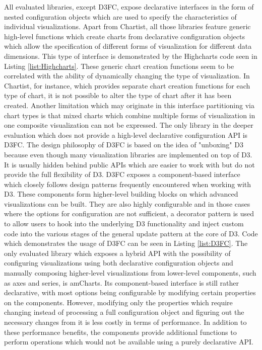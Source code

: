 All evaluated libraries, except D3FC, expose declarative interfaces in the form of nested configuration objects which are used to specify the characteristics of individual visualizations. 
Apart from Chartist, all those libraries feature generic high-level functions which create charts from declarative configuration objects which allow the specification of different forms of visualization for different data dimensions. 
This type of interface is demonstrated by the Highcharts code seen in Listing \ref{list:Highcharts}. 
These generic chart creation functions seem to be correlated with the ability of dynamically changing the type of visualization. 
In Chartist, for instance, which provides separate chart creation functions for each type of chart, it is not possible to alter the type of chart after it has been created. 
Another limitation which may originate in this interface partitioning via chart types is that mixed charts which combine multiple forms of visualization in one composite visualization can not be expressed. 
The only library in the deeper evaluation which does not provide a high-level declarative configuration API is D3FC. 
The design philosophy of D3FC is based on the idea of "unboxing" D3 because even though many visualization libraries are implemented on top of D3. 
It is usually hidden behind public APIs which are easier to work with but do not provide the full flexibility of D3. 
D3FC exposes a component-based interface which closely follows design patterns frequently encountered when working with D3. 
These components form higher-level building blocks on which advanced visualizations can be built. 
They are also highly configurable and in those cases where the options for configuration are not sufficient, a decorator pattern is used to allow users to hook into the underlying D3 functionality and inject custom code into the various stages of the general update pattern at the core of D3.
Code which demonstrates the usage of D3FC can be seen in Listing \ref{list:D3FC}. 
The only evaluated library which exposes a hybrid API with the possibility of configuring visualizations using both declarative configuration objects and manually composing higher-level visualizations from lower-level components, such as axes and series, is amCharts.
Its component-based interface is still rather declarative, with most options being configurable by modifying certain properties on the components.
However, modifying only the properties which require changing instead of processing a full configuration object and figuring out the necessary changes from it is less costly in terms of performance. 
In addition to these performance benefits, the components provide additional functions to perform operations which would not be available using a purely declarative API.


